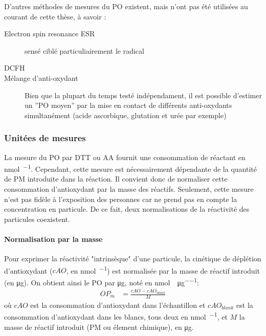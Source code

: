 D'autres méthodes de mesures du PO existent, mais n'ont pas été utilisées au courant de
cette thèse, à savoir :
\begin{description}
    \item[Electron spin resonance ESR] sensé ciblé particuliairement le radical
         \autocite{shiHydroxyl2003,shiTemporal2003}
    \item[DCFH]
    \item[Mélange d'anti-oxydant] Bien que la plupart du temps testé indépendament, il est
        possible d'estimer un ''PO moyen'' par la mise en contact de différents
        anti-oxydants simultanément (acide ascorbique, glutation et urée par exemple)~\autocite{calasComparison2018}
\end{description}

\subsubsection{Unitées de mesures}%
\label{ssub:unitees_de_mesures}

La mesure du PO par DTT ou AA fournit une consommation de réactant en \si{\nano\mole\per\min}.
Cependant, cette mesure est nécessairement dépendante de la quantité de PM introduite dans
la réaction.
Il convient donc de normaliser cette consommation d'antioxydant par la masse des réactifs.
Seulement, cette mesure n'est pas fidèle à l'exposition des personnes car ne prend pas en
compte la concentration en particule. De ce fait, deux normalisations de la réactivité des
particules coexistent.

\paragraph{Normalisation par la masse}%
\label{par:normalisation_par_la_masse}
Pour exprimer la réactivité "intrinsèque" d'une particule, la cinétique de déplétion
d'antioxydant ($cAO$, en \si{\nmol\per\min}) est normalisée par la masse de réactif
introduit (en \si{\ug}). On obtient ainsi le PO par \si{\ug}, noté \OPm{} en
\si{\nmol\per\min\per\micro\g}:
\begin{align}
    \label{eq:opm}
    OP_m &= \frac{cAO - cAO_{blank}}{M}
\end{align}
où $cAO$ est la consommation d'antioxydant dans l'échantillon et $cAO_{blank}$
est la consommation d'antioxydant dans les blancs, tous deux en \si{\nmol\per\min}, et $M$
la masse de réactif introduit (PM ou élement chimique), en \si{\ug}.

